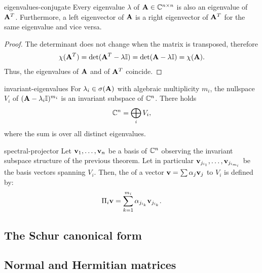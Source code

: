 \begin{Lemma}{eigenvalues-conjugate}
  Every eigenvalue $\lambda$ of $\mathbf A\in\mathbb C^{n\times n}$ is also an
  eigenvalue of $\mathbf A^T$. Furthermore, a left eigenvector of $\mathbf A$
  is a right eigenvector of $\mathbf A^T$ for the same eigenvalue and vice
  versa.
\end{Lemma}

\begin{proof}
  The determinant does not change when the matrix is transposed, therefore
  \begin{gather}
    \chi(\mathbf A^T)
    = \det(\mathbf A^T-\lambda \mathbb I)
    = \det(\mathbf A-\lambda \mathbb I)
    = \chi(\mathbf A).
  \end{gather}
  Thus, the eigenvalues of $\mathbf A$ and of $\mathbf A^T$ coincide.
\end{proof}

\begin{Theorem}{invariant-eigenvalues}
  For $\lambda_i\in \sigma(\mathbf A)$ with algebraic multiplicity $m_i$, the
  nullspace $V_i$ of $(\mathbf A-\lambda_i\mathbb I)^{m_i}$ is an invariant subspace
  of $\mathbb C^n$. There holds
  \begin{gather}
    \mathbb C^n = \bigoplus_{i} V_i,
  \end{gather}
  where the sum is over all distinct eigenvalues.
\end{Theorem}

\begin{Definition}{spectral-projector}
  Let $\mathbf v_1,\dots,\mathbf v_n$ be a basis of $\mathbb C^n$ observing the invariant
  subspace structure of the previous theorem. Let in particular
  $\mathbf v_{j_{i_1}},\dots,\mathbf v_{j_{i_{m_i}}}$ be the basis vectors spanning
  $V_i$. Then, the  of a vector $\mathbf v = \sum \alpha_j \mathbf v_j$ to
  $V_i$ is defined by:
  \begin{gather}
    \Pi_i \mathbf v = \sum_{k=1}^{m_i} \alpha_{j_{i_k}} \mathbf v_{j_{i_k}}.
  \end{gather}
\end{Definition}

\subsection{The Schur canonical form}


\subsection{Normal and Hermitian matrices}

